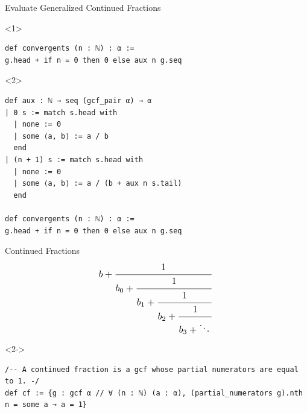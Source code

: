 \documentclass{beamer}
\begin{document}
\begin{frame}[fragile]{Evaluate Generalized Continued Fractions}
\begin{onlyenv}<1>
\begin{verbatim}
def convergents (n : ℕ) : α :=
g.head + if n = 0 then 0 else aux n g.seq
\end{verbatim}
\end{onlyenv}
\begin{onlyenv}<2>
\begin{verbatim}
def aux : ℕ → seq (gcf_pair α) → α
| 0 s := match s.head with
  | none := 0
  | some ⟨a, b⟩ := a / b
  end
| (n + 1) s := match s.head with
  | none := 0
  | some ⟨a, b⟩ := a / (b + aux n s.tail)
  end

def convergents (n : ℕ) : α :=
g.head + if n = 0 then 0 else aux n g.seq
\end{verbatim}
\end{onlyenv}

\end{frame}
\begin{frame}[fragile]{Continued Fractions}
\begin{equation*}
\resizebox{0.4\hsize}{!}{$
b + \cfrac{1}{b_0 + \cfrac{1}{b_1 + \cfrac{1}{b_2 + \cfrac{1}{b_3 + \ddots\,}}}}$
}
\end{equation*}
\pause
\vspace{-5mm}
\begin{visibleenv}<2->
\begin{verbatim}
/-- A continued fraction is a gcf whose partial numerators are equal to 1. -/
def cf := {g : gcf α // ∀ (n : ℕ) (a : α), (partial_numerators g).nth n = some a → a = 1}
\end{verbatim}
\end{visibleenv}
\end{frame}
\end{document}
